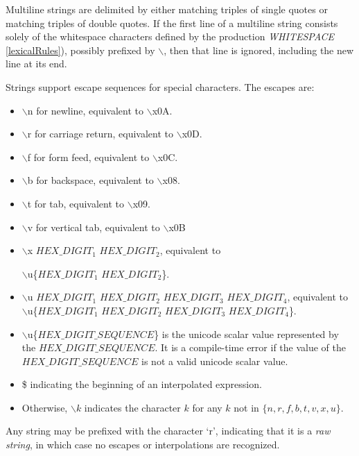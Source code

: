 \documentclass{article}
\begin{document}
\LMHash{}
Multiline strings are delimited by either matching triples of single quotes or matching triples of double quotes. If the first line of a multiline string consists solely of the whitespace characters defined by the production {\em WHITESPACE}  \ref{lexicalRules}), possibly prefixed by $\backslash$, then that line is ignored, including the new line at its end.

 

\LMHash{}
Strings support escape sequences for special characters. The escapes are:
\begin{itemize}
\item  $\backslash$n for newline, equivalent to $\backslash$x0A.
\item $\backslash$r for carriage return, equivalent to $\backslash$x0D.
\item $\backslash$f for form feed, equivalent to $\backslash$x0C.
\item $\backslash$b for backspace, equivalent to $\backslash$x08.
\item $\backslash$t for tab, equivalent to $\backslash$x09.
\item $\backslash$v for vertical tab, equivalent to $\backslash$x0B
\item $\backslash$x $HEX\_DIGIT_1$ $HEX\_DIGIT_2$, equivalent to 

$\backslash$u\{$HEX\_DIGIT_1$ $HEX\_DIGIT_2$\}.
\item $\backslash$u $HEX\_DIGIT_1$ $HEX\_DIGIT_2$ $HEX\_DIGIT_3$ $HEX\_DIGIT_4$, equivalent to $\backslash$u\{$HEX\_DIGIT_1$ $HEX\_DIGIT_2$ $HEX\_DIGIT_3$ $HEX\_DIGIT_4$\}.
\item $\backslash$u\{$HEX\_DIGIT\_SEQUENCE$\} is the unicode scalar value represented by the $HEX\_DIGIT\_SEQUENCE$. It is a compile-time error if the value of the $HEX\_DIGIT\_SEQUENCE$ is not a valid unicode scalar value.
\item \$ indicating the beginning of an interpolated expression.
\item Otherwise, $\backslash k$ indicates the character $k$ for any $k$ not in $\{n, r, f, b, t, v, x, u\}$.
 \end{itemize}

\LMHash{}
Any string may be prefixed with the character `r', indicating that it is a {\em raw string}, in which case no escapes or interpolations are recognized.
\end{document}
